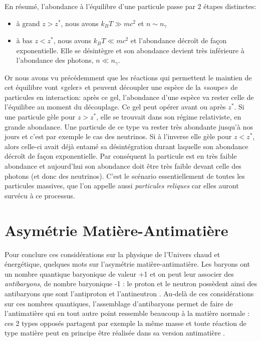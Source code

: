  
  En résumé, l'abondance à l'équilibre d'une particule passe par 2 étapes distinctes:
 \begin{itemize}
 \item à grand $z>z^*$, nous avons $k_B T \gg mc^2$ et $n\sim n_\gamma$
 \item à bas  $z<z^*$, nous avons $k_B T \ll mc^2$ et l'abondance décroît de façon exponentielle. Elle se désintègre et son abondance devient très inférieure à l'abondance des photons, $n\ll n_\gamma$.
 \end{itemize}
Or nous avons vu précédemment que les réactions qui permettent le maintien de cet équilibre vont «geler»  et peuvent découpler une espèce de la «soupe» de particules en interaction: après ce gel, l'abondance d'une espèce va rester celle de l'équilibre au moment du découplage. Ce gel peut opérer avant ou après $z^*$. Si une particule gèle pour $z>z^*$, elle se trouvait dans son régime relativiste, en grande abondance. Une particule de ce type va rester très abondante jusqu'à nos jours et c'est par exemple le cas des neutrinos. Si à l'inverse elle gèle pour $z<z^*$, alors celle-ci avait déjà entamé sa désintégration durant laquelle son abondance décroît de façon exponentielle. Par conséquent la particule est en très faible abondance et aujourd'hui son abondance doit être très faible devant celle des photons (et donc des neutrinos). C'est le scénario essentiellement de toutes les particules massives, que l'on appelle aussi \textit{particules reliques} car elles auront survécu à ce processus.
 
 \section{Asymétrie Matière-Antimatière}
Pour conclure ces considérations sur la physique de l'Univers chaud et énergétique, quelques mots sur l'asymétrie matière-antimatière. Les baryons ont un nombre quantique baryonique de valeur +1 et on peut leur associer des \textit{antibaryons}, de nombre baryonique -1 : le proton et le neutron possèdent ainsi des antibaryons que sont l'antiproton et l'antineutron . Au-delà de ces considérations sur ces nombres quantiques, l'assemblage d'antibaryons permet de faire de l'antimatière qui en tout autre point ressemble beaucoup à la matière normale : ces 2 types opposés partagent par exemple la même masse et toute réaction de type matière peut en principe être réalisée dans sa version antimatière .

